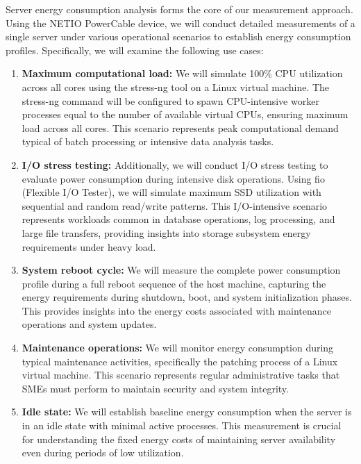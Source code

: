 Server energy consumption analysis forms the core of our measurement approach.
Using the NETIO PowerCable device, we will conduct detailed measurements of a
single server under various operational scenarios to establish energy consumption
profiles. Specifically, we will examine the following use cases:

\begin{enumerate}
    \item \textbf{Maximum computational load:} We will simulate 100\% CPU utilization across all
    cores using the stress-ng tool on a Linux virtual machine. The stress-ng
    command will be configured to spawn CPU-intensive worker processes equal to
    the number of available virtual CPUs, ensuring maximum load across all cores.
    This scenario represents peak computational demand typical of batch processing
    or intensive data analysis tasks. \cite{stressng2020}

    \item \textbf{I/O stress testing:} Additionally, we will conduct I/O stress testing to evaluate
    power consumption during intensive disk operations. Using fio (Flexible I/O Tester),
    we will simulate maximum SSD utilization with sequential and random read/write
    patterns. This I/O-intensive scenario represents workloads common in database operations,
    log processing, and large file transfers, providing insights into storage
    subsystem energy requirements under heavy load.

    \item \textbf{System reboot cycle:} We will measure the complete power consumption profile
    during a full reboot sequence of the host machine, capturing the energy
    requirements during shutdown, boot, and system initialization phases. This
    provides insights into the energy costs associated with maintenance operations
    and system updates.

    \item \textbf{Maintenance operations:} We will monitor energy consumption during typical
    maintenance activities, specifically the patching process of a Linux virtual
    machine. This scenario represents regular administrative tasks that SMEs must
    perform to maintain security and system integrity.

    \item \textbf{Idle state:} We will establish baseline energy consumption when the server is
    in an idle state with minimal active processes. This measurement is crucial
    for understanding the fixed energy costs of maintaining server availability
    even during periods of low utilization. \cite{moran2024dissecting,agilewatts2022}
\end{enumerate}

